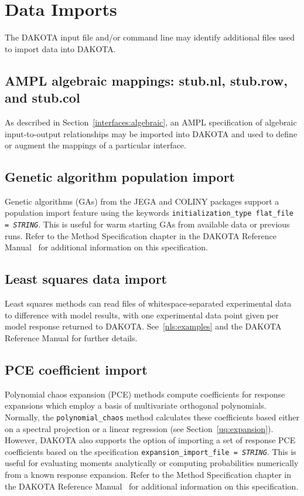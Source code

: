 \section{Data Imports}\label{input:import}

The DAKOTA input file and/or command line may identify additional
files used to import data into DAKOTA.

\subsection{AMPL algebraic mappings: stub.nl, stub.row, and stub.col}

As described in Section~\ref{interfaces:algebraic}, an AMPL
specification of algebraic input-to-output relationships may be
imported into DAKOTA and used to define or augment the mappings of a
particular interface.

\subsection{Genetic algorithm population import}

Genetic algorithms (GAs) from the JEGA and COLINY packages support a 
population import feature using the keywords 
\texttt{initialization\_type flat\_file = \emph{STRING}}.  This is 
useful for warm starting GAs from available data or previous runs.
Refer to the Method Specification chapter in the DAKOTA Reference
Manual~\cite{RefMan} for additional information on this specification.

\subsection{Least squares data import}

Least squares methods can read files of whitespace-separated
experimental data to difference with model results, with one
experimental data point given per model response returned to DAKOTA.
See~\ref{nls:examples} and the DAKOTA Reference Manual for further
details.

\subsection{PCE coefficient import}

Polynomial chaos expansion (PCE) methods compute coefficients for
response expansions which employ a basis of multivariate orthogonal
polynomials.  Normally, the \texttt{polynomial\_chaos} method
calculates these coefficients based either on a spectral projection or
a linear regression (see Section~\ref{uq:expansion}).  However,
DAKOTA also supports the option of importing a set of response PCE
coefficients based on the specification
\texttt{expansion\_import\_file = \emph{STRING}}.  This is useful for
evaluating moments analytically or computing probabilities numerically
from a known response expansion.  Refer to the Method Specification
chapter in the DAKOTA Reference Manual~\cite{RefMan} for additional
information on this specification.

